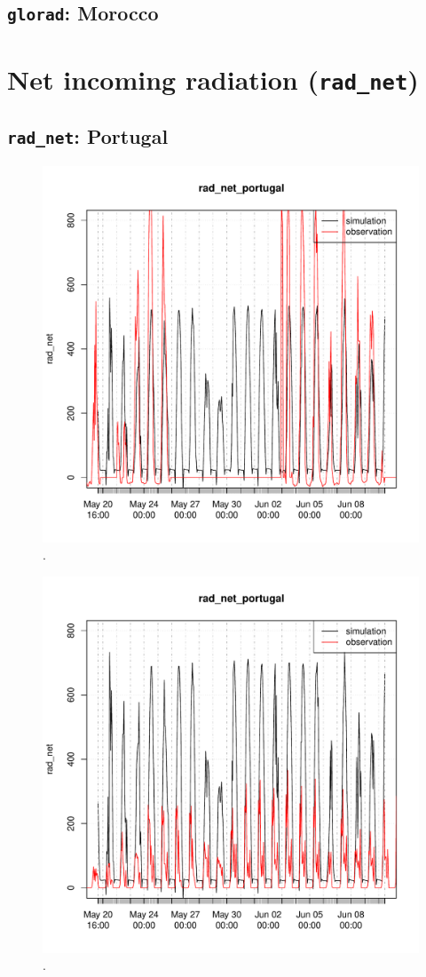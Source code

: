 \documentclass{scrreprt}
\begin{document}
\newpage
\subsection{\texttt{glorad}: Morocco}

\newpage
\section{Net incoming radiation (\texttt{rad\_net})}

\subsection{\texttt{rad\_net}: Portugal}

\begin{figure}[ht]
  \centering
  \includegraphics[width=0.5\hsize]{./plot_rad_net_compare_portugal_HS_2014-04-29_2014-07-01.pdf}
  \caption{.}
  \label{fig:portugal_HS_radnet1}
\end{figure}

\begin{figure}[ht]
  \centering
  \includegraphics[width=0.5\hsize]{./plot_rad_net_compare_portugal_NSA_2014-04-29_2014-07-01.pdf}
  \caption{.}
  \label{fig:portugal_NSA_radnet1}
\end{figure}
\end{document}

